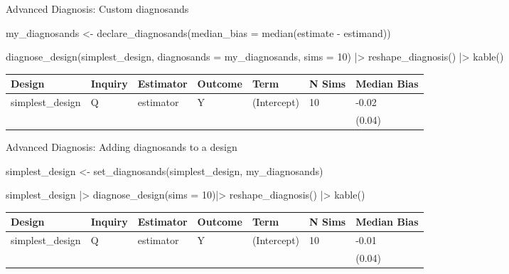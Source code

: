 \documentclass[
  11pt,
  ignorenonframetext,
]{beamer}
\newenvironment{Shaded}{\begin{snugshade}}{\end{snugshade}}
\newcommand{\AttributeTok}[1]{\textcolor[rgb]{0.40,0.45,0.13}{#1}}
\newcommand{\DecValTok}[1]{\textcolor[rgb]{0.68,0.00,0.00}{#1}}
\newcommand{\FunctionTok}[1]{\textcolor[rgb]{0.28,0.35,0.67}{#1}}
\newcommand{\NormalTok}[1]{\textcolor[rgb]{0.00,0.23,0.31}{#1}}
\newcommand{\OtherTok}[1]{\textcolor[rgb]{0.00,0.23,0.31}{#1}}
\newcommand{\SpecialCharTok}[1]{\textcolor[rgb]{0.37,0.37,0.37}{#1}}
\begin{document}
\begin{frame}[fragile]{Advanced Diagnosis: Custom diagnosands}
\protect\hypertarget{advanced-diagnosis-custom-diagnosands}{}
\begin{Shaded}
\begin{Highlighting}[]
\NormalTok{my\_diagnosands }\OtherTok{\textless{}{-}}
  \FunctionTok{declare\_diagnosands}\NormalTok{(}\AttributeTok{median\_bias =} \FunctionTok{median}\NormalTok{(estimate }\SpecialCharTok{{-}}\NormalTok{ estimand))}

\FunctionTok{diagnose\_design}\NormalTok{(simplest\_design, }\AttributeTok{diagnosands =}\NormalTok{ my\_diagnosands, }\AttributeTok{sims =} \DecValTok{10}\NormalTok{) }\SpecialCharTok{|\textgreater{}}
  \FunctionTok{reshape\_diagnosis}\NormalTok{() }\SpecialCharTok{|\textgreater{}} \FunctionTok{kable}\NormalTok{()}
\end{Highlighting}
\end{Shaded}

\begin{tabular}{l|l|l|l|l|l|l}
\hline
Design & Inquiry & Estimator & Outcome & Term & N Sims & Median Bias\\
\hline
simplest\_design & Q & estimator & Y & (Intercept) & 10 & -0.02\\
\hline
 &  &  &  &  &  & (0.04)\\
\hline
\end{tabular}
\end{frame}

\begin{frame}[fragile]{Advanced Diagnosis: Adding diagnosands to a
design}
\protect\hypertarget{advanced-diagnosis-adding-diagnosands-to-a-design}{}
\begin{Shaded}
\begin{Highlighting}[]
\NormalTok{simplest\_design }\OtherTok{\textless{}{-}} 
  \FunctionTok{set\_diagnosands}\NormalTok{(simplest\_design, my\_diagnosands)}

\NormalTok{simplest\_design }\SpecialCharTok{|\textgreater{}} \FunctionTok{diagnose\_design}\NormalTok{(}\AttributeTok{sims =} \DecValTok{10}\NormalTok{)}\SpecialCharTok{|\textgreater{}}
  \FunctionTok{reshape\_diagnosis}\NormalTok{() }\SpecialCharTok{|\textgreater{}} \FunctionTok{kable}\NormalTok{()}
\end{Highlighting}
\end{Shaded}

\begin{tabular}{l|l|l|l|l|l|l}
\hline
Design & Inquiry & Estimator & Outcome & Term & N Sims & Median Bias\\
\hline
simplest\_design & Q & estimator & Y & (Intercept) & 10 & -0.01\\
\hline
 &  &  &  &  &  & (0.04)\\
\hline
\end{tabular}
\end{frame}
\end{document}
